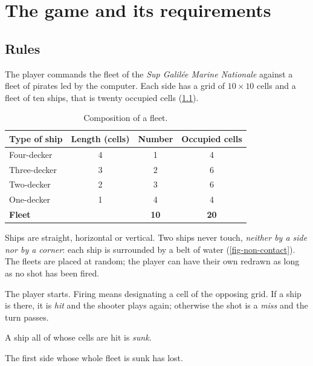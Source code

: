 \chapter{The game and its requirements}
\label{chap-exigences}

\section{Rules}

The player commands the fleet of the \emph{Sup Galilée Marine Nationale} against a fleet of
pirates led by the computer. Each side has a grid of $10 \times 10$ cells and a fleet of ten
ships, that is twenty occupied cells (\cref{tab-flotte}).

\begin{table}[ht]
    \centering
    \begin{tabular}{@{}lccc@{}}
        \toprule
        Type of ship   & Length (cells) & Number      & Occupied cells \\
        \midrule
        Four-decker    & 4              & 1           & 4              \\
        Three-decker   & 3              & 2           & 6              \\
        Two-decker     & 2              & 3           & 6              \\
        One-decker     & 1              & 4           & 4              \\
        \midrule
        \textbf{Fleet} &                & \textbf{10} & \textbf{20}    \\
        \bottomrule
    \end{tabular}
    \caption{Composition of a fleet.}
    \label{tab-flotte}
\end{table}

\begin{description}[style=nextline, leftmargin=1.2em]
    \item[Placement] Ships are straight, horizontal or vertical. Two ships never touch,
          \emph{neither by a side nor by a corner}: each ship is surrounded by a belt of water
          (\cref{fig-non-contact}). The fleets are placed at random; the player can have their own
          redrawn as long as no shot has been fired.
    \item[Turn] The player starts. Firing means designating a cell of the opposing grid. If a
          ship is there, it is \emph{hit} and the shooter plays again; otherwise the shot is a
          \emph{miss} and the turn passes.
    \item[Sunk ship] A ship all of whose cells are hit is \emph{sunk}.
    \item[End of the game] The first side whose whole fleet is sunk has lost.
\end{description}

